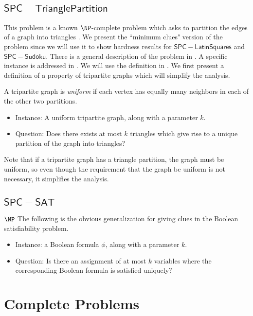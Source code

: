 \documentclass[runningheads,a4paper]{llncs}
\begin{document}
\subsection{$\mathsf{SPC-Triangle Partition}$}

This problem is a known $\NP$-complete problem which asks to partition the edges of a graph into triangles \cite{holyer1981np}. We present the ``minimum clues" version of the problem since we will use it to show hardness results for $\mathsf{SPC-Latin Squares}$ and $\mathsf{SPC-Sudoku}$. There is a general description of the problem in \cite{holyer1981np}. A specific instance is addressed in \cite{colbourn1984complexity}. We will use the definition in \cite{colbourn1984complexity}. We first present a definition of a property of tripartite graphs which will simplify the analysis.

\begin{definition}
A tripartite graph is \emph{uniform} if each vertex has equally many neighbors in each of the other two partitions.
\end{definition}

\begin{itemize}
\item Instance: A uniform tripartite graph, along with a parameter $k$.
\item Question: Does there exists at most $k$ triangles which give rise to a unique partition of the graph into triangles?
\end{itemize}

Note that if a tripartite graph has a triangle partition, the graph must be uniform, so even though the requirement that the graph be uniform is not necessary, it simplifies the analysis.

\subsection{$\mathsf{SPC-SAT}$}
$\NP$
The following is the obvious generalization for giving clues in the Boolean satisfiability problem.

\begin{itemize}
\item Instance: a Boolean formula $\phi$, along with a parameter $k$.
\item Question: Is there an assignment of at most $k$ variables where the corresponding Boolean formula is satisfied uniquely?
\end{itemize}

\section{Complete Problems}
\label{sec:complete}
\end{document}
